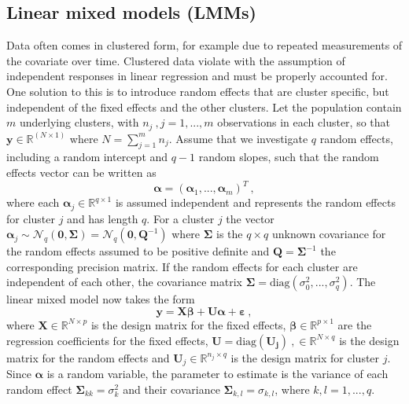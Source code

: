 \subsection{Linear mixed models (LMMs)}
\label{sec:LMM}
Data often comes in clustered form, for example due to repeated measurements of the covariate over time. 
Clustered data violate with the assumption of independent responses in linear regression and must be properly accounted for. One solution to this is to introduce random effects that are cluster specific, but independent of the fixed effects and the other clusters. Let the population contain $m$ underlying clusters, with $n_j\ , j=1, ..., m$ observations in each cluster, so that $\mathbf{y} \in \mathbb{R}^{(N \times 1)}$ where $N = \sum_{j=1}^m n_j $. Assume that we investigate $q$ random effects, including a random intercept and $q-1$ random slopes, such that the random effects vector can be written as 
\begin{equation}
    \label{eq:alpha}
    \boldsymbol{\alpha} = (\boldsymbol{\alpha}_1, ..., \boldsymbol{\alpha}_{m})^T \ ,
\end{equation}
where each $\boldsymbol{\alpha}_j \in \mathbb{R}^{q \times 1}$ is assumed independent and represents the random effects for cluster $j$ and has length $q$. For a cluster $j$ the vector $\boldsymbol{\alpha}_j \sim \mathcal{N}_q(\mathbf{0}, \mathbf{\Sigma})=\mathcal{N}_q(\mathbf{0}, \mathbf{Q}^{-1})$ where $\mathbf{\Sigma}$ is the $q \times q$ unknown covariance for the random effects assumed to be positive definite and $\mathbf{Q} = \mathbf{\Sigma}^{-1}$ the corresponding precision matrix. 
If the random effects for each cluster are independent of each other, the covariance matrix $\mathbf{\Sigma} = \text{diag}(\sigma_0^2, ..., \sigma_q^2)$.
The linear mixed model now takes the form
\begin{equation} 
    \label{eq:LMM}
    \mathbf{y} = \mathbf{X}\boldsymbol{\beta} + \mathbf{U}\boldsymbol{\alpha} + \boldsymbol{\varepsilon} \ ,
\end{equation}
where $\mathbf{X} \in \mathbb{R}^{N \times p}$ is the design matrix for the fixed effects, $\boldsymbol{\beta} \in \mathbb{R}^{p \times 1}$ are the regression coefficients for the fixed effects, $\mathbf{U} = \text{diag}(\mathbf{U_j}) \ , \in \mathbb{R}^{N \times q}$ is the design matrix for the random effects and $\mathbf{U}_j \in \mathbb{R}^{n_j \times q}$ is the design matrix for cluster $j$. 
Since $\boldsymbol{\alpha}$ is a random variable, the parameter to estimate is the variance of each random effect $\mathbf{\Sigma}_{kk}=\sigma_k^2$ and their covariance $\mathbf{\Sigma}_{k, l} = \sigma_{k, l}$, where $k, l =1, ..., q$.
